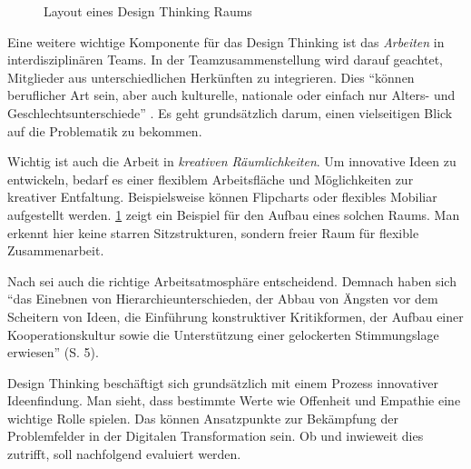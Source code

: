 \begin{figure}[H]
	\centering
	\caption[Layout eines Design Thinking Raums]{Layout eines Design Thinking Raums \protect \cite[S. 4]{lewrick_design_2018}}
	\label{fig:designthinkingroom}
\end{figure}

Eine weitere wichtige Komponente für das Design Thinking ist das \textit{Arbeiten} in interdisziplinären Teams. In der Teamzusammenstellung wird darauf geachtet, Mitglieder aus unterschiedlichen Herkünften zu integrieren. Dies ``können beruflicher Art sein, aber auch kulturelle, nationale oder einfach nur Alters- und Geschlechtsunterschiede'' \cite[S. 3]{lewrick_design_2018}. Es geht grundsätzlich darum, einen vielseitigen Blick auf die Problematik zu bekommen.

Wichtig ist auch die Arbeit in \textit{kreativen Räumlichkeiten}. Um innovative Ideen zu entwickeln, bedarf es einer flexiblem Arbeitsfläche und Möglichkeiten zur kreativer Entfaltung. Beispielsweise können Flipcharts oder flexibles Mobiliar aufgestellt werden. \ref{fig:designthinkingroom} zeigt ein Beispiel für den Aufbau eines solchen Raums. Man erkennt hier keine starren Sitzstrukturen, sondern freier Raum für flexible Zusammenarbeit.

Nach  sei auch die richtige Arbeitsatmosphäre entscheidend. Demnach haben sich ``das Einebnen von Hierarchieunterschieden, der Abbau von Ängsten vor dem Scheitern von Ideen, die Einführung konstruktiver Kritikformen, der Aufbau einer Kooperationskultur sowie die Unterstützung einer gelockerten Stimmungslage erwiesen'' (S. 5).

Design Thinking beschäftigt sich grundsätzlich mit einem Prozess innovativer Ideenfindung. Man sieht, dass bestimmte Werte wie Offenheit und Empathie eine wichtige Rolle spielen. Das können Ansatzpunkte zur Bekämpfung der Problemfelder in der Digitalen Transformation sein. Ob und inwieweit dies zutrifft, soll nachfolgend evaluiert werden.

